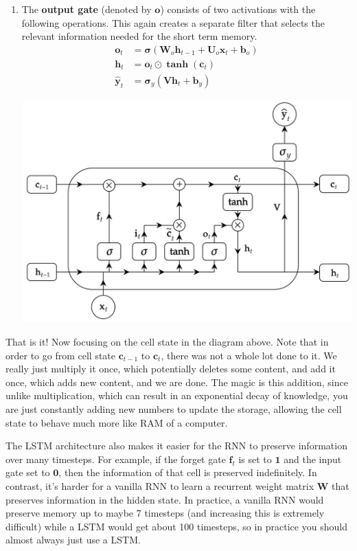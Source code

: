 \documentclass{article}
\begin{document}
\begin{enumerate}
        \item The \textbf{output gate} (denoted by $\mathbf{o}$) consists of two activations with the following operations. This again creates a separate filter that selects the relevant information needed for the short term memory. 
        \begin{align*}
            \mathbf{o}_t & = \boldsymbol{\sigma}( \mathbf{W}_o \mathbf{h}_{t-1} + \mathbf{U}_o \mathbf{x}_t + \mathbf{b}_o ) \\
            \mathbf{h}_t & = \mathbf{o}_t \odot \boldsymbol{\tanh}(\mathbf{c}_t) \\
            \hat{\mathbf{y}}_t & = \boldsymbol{\sigma}_y ( \mathbf{V} \mathbf{h}_t + \mathbf{b}_y)
        \end{align*}
        \begin{center}
            \includegraphics[scale=0.25]{img/04_RNN/LSTM_node_3.png}
        \end{center}
    \end{enumerate}
    That is it! Now focusing on the cell state in the diagram above. Note that in order to go from cell state $\mathbf{c}_{t-1}$ to $\mathbf{c}_t$, there was not a whole lot done to it. We really just multiply it once, which potentially deletes some content, and add it once, which adds new content, and we are done. The magic is this addition, since unlike multiplication, which can result in an exponential decay of knowledge, you are just constantly adding new numbers to update the storage, allowing the cell state to behave much more like RAM of a computer. 

    The LSTM architecture also makes it easier for the RNN to preserve information over many timesteps. For example, if the forget gate $\mathbf{f}_t$ is set to $\mathbf{1}$ and the input gate set to $\mathbf{0}$, then the information of that cell is preserved indefinitely. In contrast, it's harder for a vanilla RNN to learn a recurrent weight matrix $\mathbf{W}$ that preserves information in the hidden state. In practice, a vanilla RNN would preserve memory up to maybe 7 timesteps (and increasing this is extremely difficult) while a LSTM would get about 100 timesteps, so in practice you should almost always just use a LSTM. 
\end{document}
